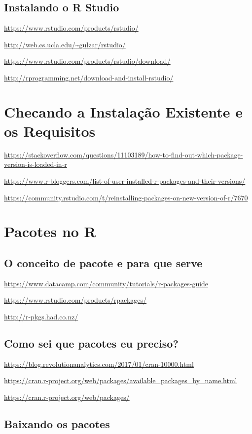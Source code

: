 \documentclass[12pt,a4paper,oneside]{erdc}
\begin{document}
\subsection{Instalando o R Studio}

\url{https://www.rstudio.com/products/rstudio/}

\url{http://web.cs.ucla.edu/~gulzar/rstudio/}

\url{https://www.rstudio.com/products/rstudio/download/}

\url{http://rprogramming.net/download-and-install-rstudio/}


\section{Checando a Instalação Existente e os Requisitos}


\url{https://stackoverflow.com/questions/11103189/how-to-find-out-which-package-version-is-loaded-in-r}

\url{https://www.r-bloggers.com/list-of-user-installed-r-packages-and-their-versions/}

\url{https://community.rstudio.com/t/reinstalling-packages-on-new-version-of-r/7670}


\section{Pacotes no R}

\subsection{O conceito de pacote e para que serve}

\url{https://www.datacamp.com/community/tutorials/r-packages-guide}

\url{https://www.rstudio.com/products/rpackages/}

\url{http://r-pkgs.had.co.nz/}

\subsection{Como sei que pacotes eu preciso?}

\url{https://blog.revolutionanalytics.com/2017/01/cran-10000.html}

\url{https://cran.r-project.org/web/packages/available_packages_by_name.html}

\url{https://cran.r-project.org/web/packages/}

\subsection{Baixando os pacotes}
\end{document}
